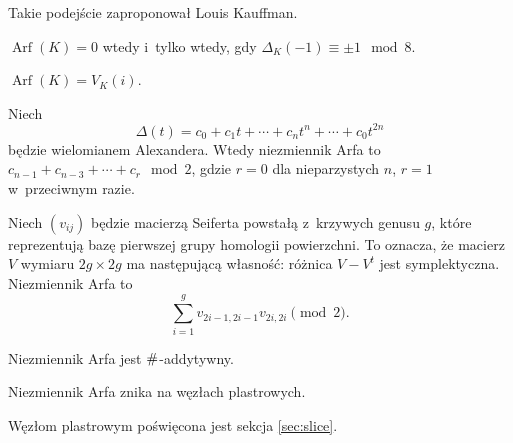 Takie podejście zaproponował Louis Kauffman.

\begin{proposition}[Murasugi]
	$\operatorname{Arf}(K) = 0$ wtedy i~tylko wtedy, gdy $\Delta_K(-1) \equiv \pm 1 \mod 8$.
\end{proposition}

\begin{proposition}[Jones, 1985]
	$\operatorname{Arf}(K) = V_K(i)$.
\end{proposition}

\begin{proposition}[Robertello]
	Niech
	\begin{equation}
		\Delta (t)=c_{0}+c_{1}t+\cdots +c_{n}t^{n}+\cdots +c_{0}t^{2n}
	\end{equation}
	będzie wielomianem Alexandera.
	Wtedy niezmiennik Arfa to $ c_{n-1}+c_{n-3}+\cdots +c_{r}\mod 2$, gdzie $r = 0$ dla nieparzystych $n$, $r = 1$ w~przeciwnym razie.
\end{proposition}

\begin{proposition}
	Niech $(v_{ij})$ będzie macierzą Seiferta powstałą z~krzywych genusu $g$, które reprezentują bazę pierwszej grupy homologii powierzchni.
	To oznacza, że macierz $V$ wymiaru $2g \times 2g$ ma następującą własność: różnica $V - V^t$ jest symplektyczna.
	Niezmiennik Arfa to
	\begin{equation}
		\sum^g_{i=1}v_{2i-1,2i-1}v_{2i,2i} \pmod 2.
	\end{equation}
\end{proposition}

\begin{proposition}
	Niezmiennik Arfa jest $\mathbin{\#}$-addytywny.
\end{proposition}

\begin{proposition}
	Niezmiennik Arfa znika na węzłach plastrowych.
\end{proposition}

Węzłom plastrowym poświęcona jest sekcja \ref{sec:slice}.

